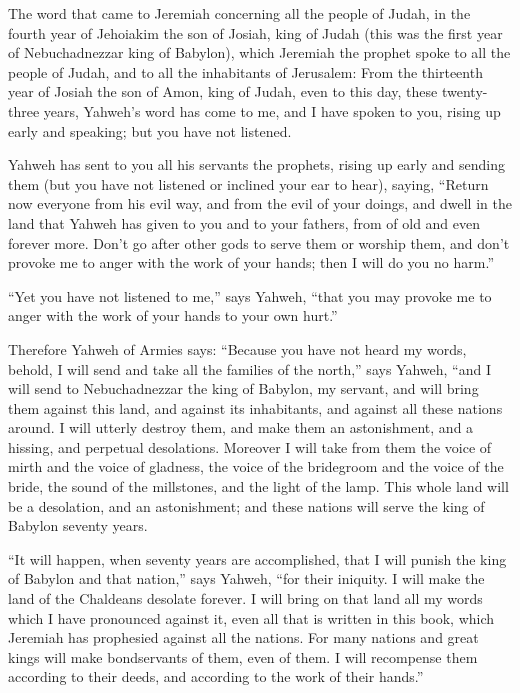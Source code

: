  The word that came to Jeremiah concerning all the people
of Judah, in the fourth year of Jehoiakim the son of Josiah, king of
Judah (this was the first year of Nebuchadnezzar king of Babylon),
 which Jeremiah the prophet spoke to all the people of
Judah, and to all the inhabitants of Jerusalem:  From the
thirteenth year of Josiah the son of Amon, king of Judah, even to this
day, these twenty-three years, Yahweh's word has come to me, and I have
spoken to you, rising up early and speaking; but you have not listened.

 Yahweh has sent to you all his servants the prophets,
rising up early and sending them (but you have not listened or inclined
your ear to hear),  saying, ``Return now everyone from his
evil way, and from the evil of your doings, and dwell in the land that
Yahweh has given to you and to your fathers, from of old and even
forever more.  Don't go after other gods to serve them or
worship them, and don't provoke me to anger with the work of your hands;
then I will do you no harm.''

 ``Yet you have not listened to me,'' says Yahweh, ``that
you may provoke me to anger with the work of your hands to your own
hurt.''

 Therefore Yahweh of Armies says: ``Because you have not
heard my words,  behold, I will send and take all the
families of the north,'' says Yahweh, ``and I will send to
Nebuchadnezzar the king of Babylon, my servant, and will bring them
against this land, and against its inhabitants, and against all these
nations around. I will utterly destroy them, and make them an
astonishment, and a hissing, and perpetual desolations. 
Moreover I will take from them the voice of mirth and the voice of
gladness, the voice of the bridegroom and the voice of the bride, the
sound of the millstones, and the light of the lamp.  This
whole land will be a desolation, and an astonishment; and these nations
will serve the king of Babylon seventy years.

 ``It will happen, when seventy years are accomplished,
that I will punish the king of Babylon and that nation,'' says Yahweh,
``for their iniquity. I will make the land of the Chaldeans desolate
forever.  I will bring on that land all my words which I
have pronounced against it, even all that is written in this book, which
Jeremiah has prophesied against all the nations.  For
many nations and great kings will make bondservants of them, even of
them. I will recompense them according to their deeds, and according to
the work of their hands.''

